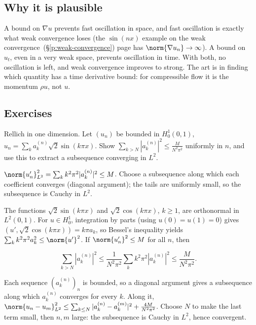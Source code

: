 \subsection*{Why it is plausible}

A bound on $\nabla u$ prevents fast oscillation in space, and fast oscillation is exactly what weak convergence loses (the $\sin(nx)$ example on the weak convergence~(\S\ref{p:weak-convergence}) page has $\norm{\nabla u_n}\to\infty$). A bound on $u_t$, even in a very weak space, prevents oscillation in time. With both, no oscillation is left, and weak convergence improves to strong. The art is in finding which quantity has a time derivative bound: for compressible flow it is the momentum $\rho u$, not $u$.

\subsection*{Exercises}

\begin{exercise}
  Rellich in one dimension. Let $(u_n)$ be bounded in $H^1_0(0,1)$, $u_n = \sum_k a_k^{(n)}\sqrt2\sin(k\pi x)$. Show $\sum_{k> N}|a_k^{(n)}|^2 \le \frac{M}{N^2\pi^2}$ uniformly in $n$, and use this to extract a subsequence converging in $L^2$.
  \begin{hint}
    $\norm{u_n'}_{L^2}^2 = \sum_k k^2\pi^2|a_k^{(n)}|^2 \le M$. Choose a subsequence along which each coefficient converges (diagonal argument); the tails are uniformly small, so the subsequence is Cauchy in $L^2$.
  \end{hint}
  \begin{solution}
    The functions $\sqrt2\sin(k\pi x)$ and $\sqrt2\cos(k\pi x)$, $k \ge 1$, are orthonormal in $L^2(0,1)$. For $u \in H^1_0$, integration by parts (using $u(0) = u(1) = 0$) gives $(u', \sqrt2\cos(k\pi x)) = k\pi a_k$, so Bessel's inequality yields $\sum_kk^2\pi^2a_k^2 \le \norm{u'}^2$. If $\norm{u_n'}^2 \le M$ for all $n$, then

    \[ \sum_{k> N}|a_k^{(n)}|^2 \le \frac{1}{N^2\pi^2}\sum_kk^2\pi^2|a_k^{(n)}|^2 \le \frac{M}{N^2\pi^2}. \]

    Each sequence $(a_k^{(n)})_n$ is bounded, so a diagonal argument gives a subsequence along which $a_k^{(n)}$ converges for every $k$. Along it, $\norm{u_n - u_m}_{L^2}^2 \le \sum_{k\le N}|a_k^{(n)} - a_k^{(m)}|^2 + \frac{4M}{N^2\pi^2}$. Choose $N$ to make the last term small, then $n, m$ large: the subsequence is Cauchy in $L^2$, hence convergent.
  \end{solution}
\end{exercise}


